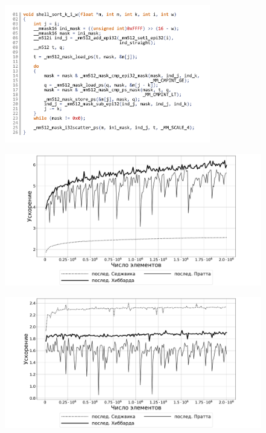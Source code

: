 \begin{figure}[ht]
	\centering
		\includegraphics[width=0.8\textwidth]{./pics/text_4_vec_irreg/shell_code_vec.pdf}
	\caption{}
	\label{fig:text_4_vec_irreg_shell_code_vec}
\end{figure}

\begin{figure}[ht]
	\centering
		\includegraphics[width=1.0\textwidth]{./pics/text_4_vec_irreg/theoretical_eff.pdf}
	\caption{}
	\label{fig:text_4_vec_irreg_theoretical_eff}
\end{figure}

\begin{figure}[ht]
	\centering
		\includegraphics[width=1.0\textwidth]{./pics/text_4_vec_irreg/experimental_eff.pdf}
	\caption{}
	\label{fig:text_4_vec_irreg_experimental_eff}
\end{figure}

